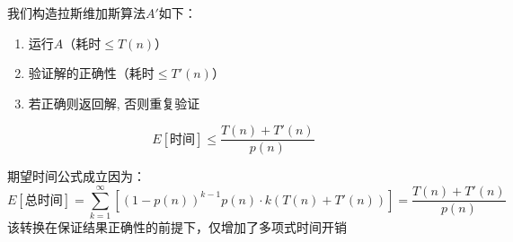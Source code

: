 \documentclass[./../main.tex]{subfiles} %
\begin{document}
我们构造拉斯维加斯算法$A'$如下：
\begin{enumerate}
    \item 运行$A$（耗时$\leq T(n)$）
    \item 验证解的正确性（耗时$\leq T'(n)$）
    \item 若正确则返回解, 否则重复验证
\end{enumerate}

$$
   E[\text{时间}] \leq \frac{T(n) + T'(n)}{p(n)}
$$

期望时间公式成立因为：
  $$
  E[\text{总时间}] = \sum_{k=1}^{\infty} \left[(1-p(n))^{k-1} p(n) \cdot k (T(n) + T'(n))\right] = \frac{T(n) + T'(n)}{p(n)}
  $$
该转换在保证结果正确性的前提下，仅增加了多项式时间开销
\end{document}
